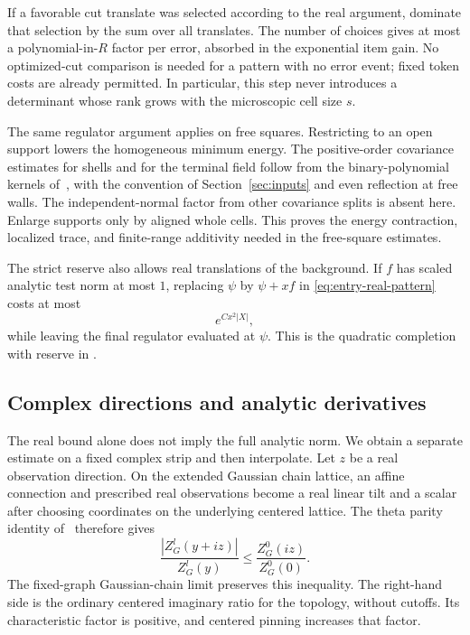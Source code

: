 If a favorable cut translate was selected according to the real
argument, dominate that selection by the sum over all translates.
The number of choices gives at most a polynomial-in-$R$ factor per
error, absorbed in the exponential item gain. No optimized-cut
comparison is needed for a pattern with no error event; fixed
token costs are already permitted. In particular, this step never
introduces a determinant whose rank grows with the microscopic
cell size $s$.

The same regulator argument applies on free squares. Restricting
to an open support lowers the homogeneous minimum energy. The
positive-order covariance estimates for shells and for the terminal
field follow from the binary-polynomial kernels of~\cite{B}, with
the convention of Section~\ref{sec:inputs} and even reflection at
free walls. The independent-normal factor from other covariance
splits is absent here. Enlarge supports only by aligned whole
cells. This proves the energy contraction, localized trace, and
finite-range additivity needed in the free-square estimates.

The strict reserve also allows real translations of the background.
If $f$ has scaled analytic test norm at most $1$, replacing $\psi$
by $\psi+xf$ in \eqref{eq:entry-real-pattern} costs at most
\begin{equation}\label{eq:entry-real-translation}
                             e^{Cx^2|X|},
\end{equation}
while leaving the final regulator evaluated at $\psi$. This is
the quadratic completion with reserve in
\cite[Equation (9.28)]{B}.

\subsection{Complex directions and analytic derivatives}

The real bound alone does not imply the full analytic norm. We obtain
a separate estimate on a fixed complex strip and then interpolate.
Let $z$ be a real observation direction. On the extended Gaussian
chain lattice, an affine connection and prescribed real observations
become a real linear tilt and a scalar after choosing coordinates
on the underlying centered lattice. The theta parity identity
of~\cite[Equation (9.29)]{B} therefore gives
\begin{equation}\label{eq:entry-complex-comparison}
           \frac{|Z_G^l(y+iz)|}{Z_G^l(y)}
                    \le\frac{Z_G^0(iz)}{Z_G^0(0)}.
\end{equation}
The fixed-graph Gaussian-chain limit preserves this inequality.
The right-hand side is the ordinary centered imaginary ratio for
the topology, without cutoffs. Its characteristic factor is positive,
and centered pinning increases that factor.

